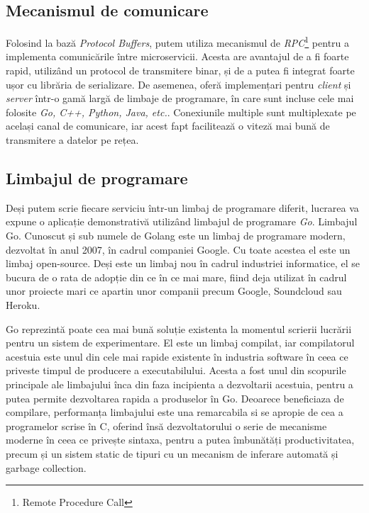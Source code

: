 \subsection{Mecanismul de comunicare}

Folosind la bază \textit{Protocol Buffers}, putem utiliza mecanismul de \textit{RPC}\footnote{Remote Procedure Call} pentru a implementa comunicările între microservicii. Acesta are avantajul de a fi foarte rapid, utilizând un protocol de transmitere binar, și de a putea fi integrat foarte ușor cu librăria de serializare. De asemenea, oferă implemențari pentru \textit{client} și \textit{server} într-o gamă largă de limbaje de programare, în care sunt incluse cele mai folosite \textit{Go, C++, Python, Java, etc.}. Conexiunile multiple sunt multiplexate pe același canal de comunicare, iar acest fapt facilitează o viteză mai bună de transmitere a datelor pe rețea.

\subsection{Limbajul de programare}

Deși putem scrie fiecare serviciu într-un limbaj de programare diferit, lucrarea va expune o aplicație demonstrativă utilizând limbajul de programare \textit{Go}. Limbajul Go. Cunoscut și sub numele de Golang este un limbaj de programare modern, dezvoltat în anul 2007, în cadrul companiei Google. Cu toate acestea el este un limbaj open-source. Deși este un limbaj nou în cadrul industriei informatice, el se bucura de o rata de adopție din ce în ce mai mare, fiind deja utilizat în cadrul unor
proiecte mari ce apartin unor companii precum Google, Soundcloud sau Heroku.

Go reprezintă poate cea mai bună soluție existenta la
momentul scrierii lucrării pentru un sistem de experimentare. El este un limbaj compilat, iar compilatorul acestuia este unul din cele mai rapide existente în industria
software în ceea ce priveste timpul de producere a executabilului. Acesta a fost unul din scopurile principale ale limbajului înca din faza incipienta a dezvoltarii acestuia, pentru a putea permite dezvoltarea rapida a produselor în Go. Deoarece beneficiaza de compilare, performanța limbajului este una remarcabila si se apropie de cea a programelor scrise în C, oferind însă dezvoltatorului o serie de mecanisme moderne în ceea ce privește sintaxa, pentru a putea îmbunătăți productivitatea, precum și un sistem static de tipuri cu un mecanism de inferare automată și garbage collection. 


